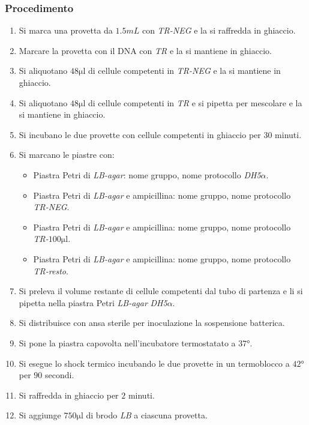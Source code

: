 		\subsubsection{Procedimento}
		\begin{enumerate}
			\item Si marca una provetta da $1.5\si{mL}$ con \emph{TR-NEG} e la si raffredda in ghiaccio.
			\item Marcare la provetta con il DNA con \emph{TR} e la si mantiene in ghiaccio.
			\item Si aliquotano $48\si{\micro\litre}$ di cellule competenti in \emph{TR-NEG} e la si mantiene in ghiaccio.
			\item Si aliquotano $48\si{\micro\litre}$ di cellule competenti in \emph{TR} e si pipetta per mescolare e la si mantiene in ghiaccio.
			\item Si incubano le due provette con cellule competenti in ghiaccio per $30$ minuti.
			\item Si marcano le piastre con:
				\begin{multicols}{2}
					\begin{itemize}
						\item Piastra Petri di \emph{LB-agar}: nome gruppo, nome protocollo \emph{DH5$\alpha$}.
						\item Piastra Petri di \emph{LB-agar} e ampicillina: nome gruppo, nome protocollo \emph{TR-NEG}.
						\item Piastra Petri di \emph{LB-agar} e ampicillina: nome gruppo, nome protocollo \emph{TR-$100\si{\micro\litre}$}.
						\item Piastra Petri di \emph{LB-agar} e ampicillina: nome gruppo, nome protocollo \emph{TR-resto}.
					\end{itemize}
				\end{multicols}
			\item Si preleva il volume restante di cellule competenti dal tubo di partenza e li si pipetta nella piastra Petri \emph{LB-agar} \emph{DH5$\alpha$}.
			\item Si distribuisce con ansa sterile per inoculazione la sospensione batterica.
			\item Si pone la piastra capovolta nell'incubatore termostatato a $37\si{\degree}$.
			\item Si esegue lo shock termico incubando le due provette in un termoblocco a $42\si{\degree}$ per $90$ secondi.
			\item Si raffredda in ghiaccio per $2$ minuti.
			\item Si aggiunge $750\si{\micro\litre}$ di brodo \emph{LB} a ciascuna provetta.

\end{enumerate}
